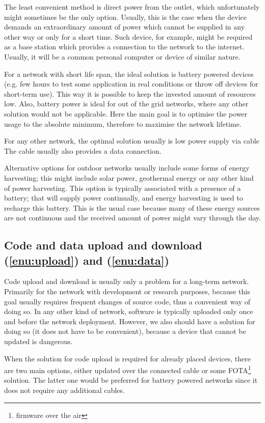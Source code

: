 \documentclass[
  print, %
  Table,   %
  nolof,     %
  nolot,     %
           oneside
]{fithesis3}
\begin{document}
  The least convenient method is direct power from the outlet, which unfortunately might sometimes be the only option. Usually, this is the case when the device demands an extraordinary amount of power which cannot be supplied in any other way or only for a short time. Such device, for example, might be required as a base station which provides a connection to the network to the internet. Usually, it will be a common personal computer or device of similar nature.

  For a network with short life span, the ideal solution is battery powered devices (e.g. few hours to test some application in real conditions or throw off devices for short-term use). This way it is possible to keep the invested amount of resources low. Also, battery power is ideal for out of the grid networks, where any other solution would not be applicable. Here the main goal is to optimise the power usage to the absolute minimum, therefore to maximise the network lifetime.

  For any other network, the optimal solution usually is low power supply via cable The cable usually also provides a data connection.

  Alternative options for outdoor networks usually include some forms of energy harvesting; this might include solar power, geothermal energy or any other kind of power harvesting. This option is typically associated with a presence of a battery; that will supply power continually, and energy harvesting is used to recharge this battery. This is the usual case because many of these energy sources are not continuous and the received amount of power might vary through the day.

  \subsection{Code and data upload and download (\ref{enu:upload}) and (\ref{enu:data})}
  Code upload and download is usually only a problem for a long-term network. Primarily for the network with development or research purposes, because this goal usually requires frequent changes of source code, thus a convenient way of doing so. In any other kind of network, software is typically uploaded only once and before the network deployment. However, we also should have a solution for doing so (it does not have to be convenient), because a device that cannot be updated is dangerous.

  When the solution for code upload is required for already placed devices, there are two main options, either updated over the connected cable or some FOTA\footnote{firmware over the air} solution. The latter one would be preferred for battery powered networks since it does not require any additional cables.
\end{document}
